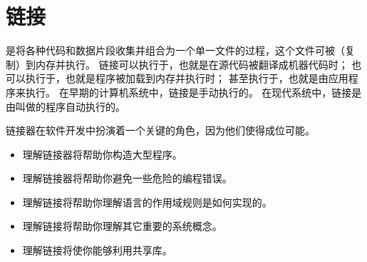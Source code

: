 
\chapter{链接}
{
    是将各种代码和数据片段收集并组合为一个单一文件的过程，这个文件可被（复制）到内存并执行。
    链接可以执行于，也就是在源代码被翻译成机器代码时；
    也可以执行于，也就是程序被加载到内存并执行时；
    甚至执行于，也就是由应用程序来执行。
    在早期的计算机系统中，链接是手动执行的。
    在现代系统中，链接是由叫做的程序自动执行的。

    链接器在软件开发中扮演着一个关键的角色，因为他们使得成位可能。

    \begin{itemize}
        \item 理解链接器将帮助你构造大型程序。
        \item 理解链接器将帮助你避免一些危险的编程错误。
        \item 理解链接将帮助你理解语言的作用域规则是如何实现的。
        \item 理解链接将帮助你理解其它重要的系统概念。
        \item 理解链接将使你能够利用共享库。
    \end{itemize}

    
}

\cleardoublepage

\endinput

